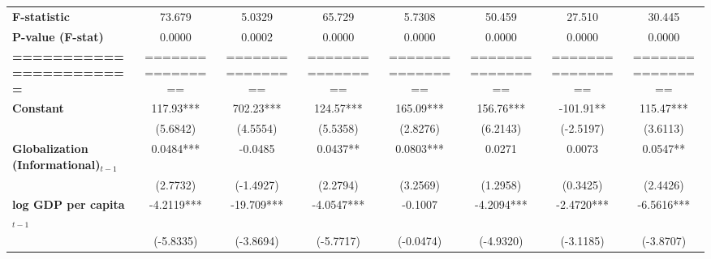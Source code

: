\begin{center}
\begin{tabular}{lccccccc}
\textbf{F-statistic}               &        73.679        &            5.0329           &            65.729            &                5.7308               &              50.459              &            27.510           &             30.445             \\
\textbf{P-value (F-stat)}          &        0.0000        &            0.0002           &            0.0000            &                0.0000               &              0.0000              &            0.0000           &             0.0000             \\
\textbf{=======================}   &   ================   &       ================      &       ================       &           ================          &         ================         &       ================      &        ================        \\
\textbf{Constant}                     &      117.93***       &          702.23***          &          124.57***           &              165.09***              &            156.76***             &          -101.91**          &           115.47***            \\
\textbf{ }                         &       (5.6842)       &           (4.5554)          &           (5.5358)           &               (2.8276)              &             (6.2143)             &          (-2.5197)          &            (3.6113)            \\
\textbf{Globalization (Informational)$_{t-1}$}             &      0.0484***       &           -0.0485           &           0.0437**           &              0.0803***              &              0.0271              &            0.0073           &            0.0547**            \\
\textbf{ }                         &       (2.7732)       &          (-1.4927)          &           (2.2794)           &               (3.2569)              &             (1.2958)             &           (0.3425)          &            (2.4426)            \\
\textbf{log GDP per capita$_{t-1}$}           &      -4.2119***      &          -19.709***         &          -4.0547***          &               -0.1007               &            -4.2094***            &          -2.4720***         &           -6.5616***           \\
\textbf{ }                         &      (-5.8335)       &          (-3.8694)          &          (-5.7717)           &              (-0.0474)              &            (-4.9320)             &          (-3.1185)          &           (-3.8707)            \\

\end{tabular}
\end{center}
